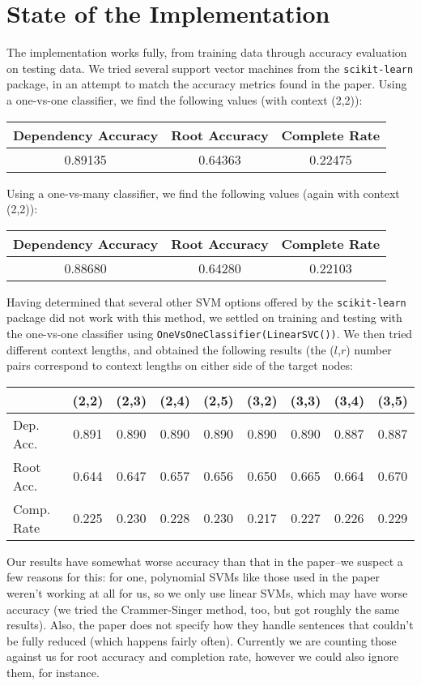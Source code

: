 \documentclass[12pt,fleqn]{article}
\begin{document}
    \section*{State of the Implementation}
    The implementation works fully, from training data through accuracy evaluation on testing data. We tried several support vector machines from the \texttt{scikit-learn} package, in an attempt to match the accuracy metrics found in the paper. Using a one-vs-one classifier, we find the following values (with context (2,2)):
    \begin{center}
        \begin{tabular}{|c|c|c|}
            \hline Dependency Accuracy & Root Accuracy & Complete Rate \\ \hline
            0.89135 & 0.64363 & 0.22475 \\ \hline
        \end{tabular}
    \end{center}
    Using a one-vs-many classifier, we find the following values (again with context (2,2)):
    \begin{center}
        \begin{tabular}{|c|c|c|}
            \hline Dependency Accuracy & Root Accuracy & Complete Rate \\ \hline
            0.88680 & 0.64280 & 0.22103 \\ \hline
        \end{tabular}
    \end{center}
    Having determined that several other SVM options offered by the \texttt{scikit-learn} package did not work with this method, we settled on training and testing with the one-vs-one classifier using \texttt{OneVsOneClassifier(LinearSVC())}. We then tried different context lengths, and obtained the following results (the ($l$,$r$) number pairs correspond to context lengths on either side of the target nodes:
    \begin{center}
        \begin{tabular}{|l|cccc|cccc|}
            \cline{2-9} \multicolumn{1}{c|}{} & (2,2) & (2,3) & (2,4) & (2,5) & (3,2) & (3,3) & (3,4) & (3,5) \\ \hline
            Dep. Acc. & 0.891 & 0.890 & 0.890 & 0.890 & 0.890 & 0.890 & 0.887 & 0.887 \\
            Root Acc. & 0.644 & 0.647 & 0.657 & 0.656 & 0.650 & 0.665 & 0.664 & 0.670 \\
            Comp. Rate & 0.225 & 0.230 & 0.228 & 0.230 & 0.217 & 0.227 & 0.226 & 0.229 \\ \hline
        \end{tabular}
    \end{center}
    Our results have somewhat worse accuracy than that in the paper--we suspect a few reasons for this: for one, polynomial SVMs like those used in the paper weren't working at all for us, so we only use linear SVMs, which may have worse accuracy (we tried the Crammer-Singer method, too, but got roughly the same results). Also, the paper does not specify how they handle sentences that couldn't be fully reduced (which happens fairly often). Currently we are counting those against us for root accuracy and completion rate, however we could also ignore them, for instance.
\end{document}
